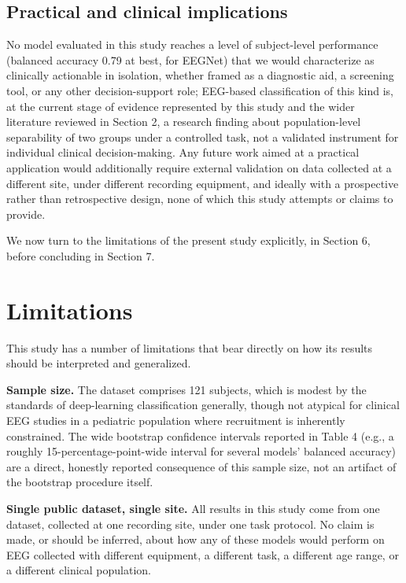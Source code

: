 \documentclass[a4paper,fleqn]{cas-sc}
\begin{document}
\subsection{Practical and clinical implications}

No model evaluated in this study reaches a level of subject-level performance (balanced accuracy 0.79 at best, for EEGNet) that we would characterize as clinically actionable in isolation, whether framed as a diagnostic aid, a screening tool, or any other decision-support role; EEG-based classification of this kind is, at the current stage of evidence represented by this study and the wider literature reviewed in Section 2, a research finding about population-level separability of two groups under a controlled task, not a validated instrument for individual clinical decision-making. Any future work aimed at a practical application would additionally require external validation on data collected at a different site, under different recording equipment, and ideally with a prospective rather than retrospective design, none of which this study attempts or claims to provide.



We now turn to the limitations of the present study explicitly, in Section 6, before concluding in Section 7.



\section{Limitations}

This study has a number of limitations that bear directly on how its results should be interpreted and generalized.



\textbf{Sample size.} The dataset comprises 121 subjects, which is modest by the standards of deep-learning classification generally, though not atypical for clinical EEG studies in a pediatric population where recruitment is inherently constrained. The wide bootstrap confidence intervals reported in Table 4 (e.g., a roughly 15-percentage-point-wide interval for several models' balanced accuracy) are a direct, honestly reported consequence of this sample size, not an artifact of the bootstrap procedure itself.



\textbf{Single public dataset, single site.} All results in this study come from one dataset, collected at one recording site, under one task protocol. No claim is made, or should be inferred, about how any of these models would perform on EEG collected with different equipment, a different task, a different age range, or a different clinical population.
\end{document}
